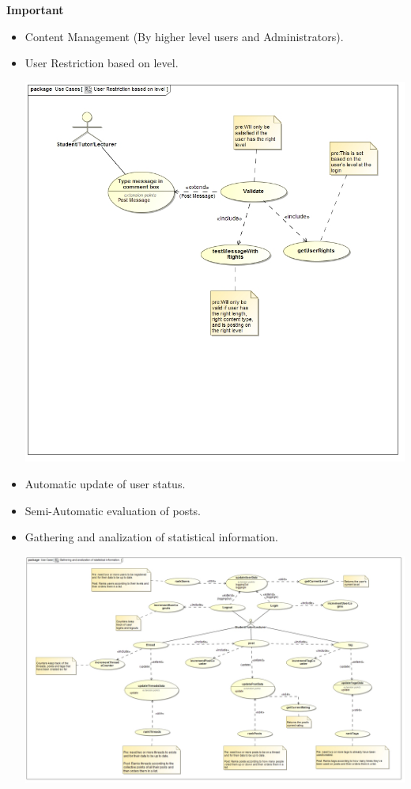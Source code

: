 \documentclass[a4paper,12pt]{report}
\begin{document}
\textbf{Important} 
\begin{itemize}
  \item Content Management (By higher level users and Administrators).
  \item User Restriction based on level.
	\begin{center}
  	\includegraphics[width=1\textwidth]{../Functional_Requirements_DIagrams/UseCases/use_case_message_Restriction.jpg}\\[0.4cm]    
	\end{center}	
  \item Automatic update of user status.
  \item Semi-Automatic evaluation of posts.
  \item Gathering and analization of statistical information.
	\begin{center}
  	\includegraphics[width=1\textwidth]{../Functional_Requirements_DIagrams/UseCases/UseCase_StatisticalInformation.jpg}\\[0.4cm]    

\end{center}
\end{itemize}
\end{document}
